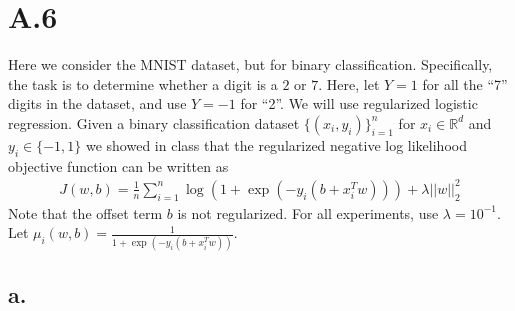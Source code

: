 \documentclass{article}
\newcommand{\field}[1]{\mathbb{#1}}
\newcommand{\1}{\mathbf{1}}
\newcommand{\R}{\field{R}} %
\begin{document}
\section*{A.6}
{\Large 

Here we consider the MNIST dataset, but for binary classification. Specifically, the task is to determine whether a digit is a $2$ or $7$.
Here, let $Y=1$ for all the ``7'' digits in the dataset, and use $Y=-1$ for ``2''.
We will use regularized logistic regression. 
Given a binary classification dataset $\{(x_i,y_i)\}_{i=1}^n$ for $x_i \in \R^d$ and $y_i \in \{-1,1\}$ we showed in class that the regularized negative log likelihood objective function can be written as
\begin{align*}
J(w,b) = \frac{1}{n} \sum_{i=1}^n \log( 1 + \exp(-y_i (b + x_i^T w))) + \lambda ||w||_2^2
\end{align*} 
Note that the offset term $b$ is not regularized. 
For all experiments, use $\lambda = 10^{-1}$. 
Let $\mu_i(w,b) = \frac{1}{1+ \exp(-y_i (b + x_i^T w))}$.


\subsection*{a.}

}
\end{document}
